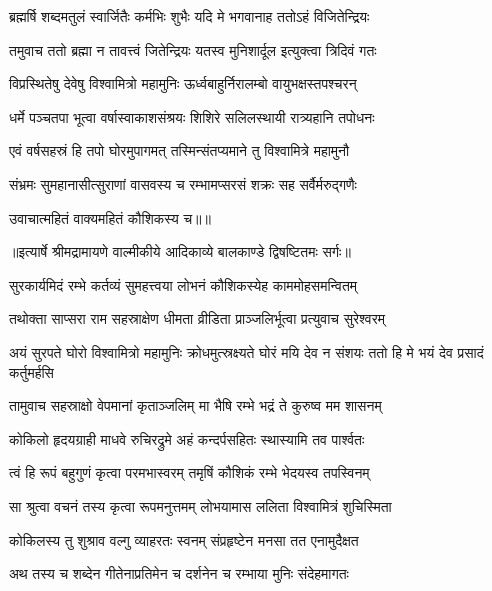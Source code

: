\twolineshloka
{ब्रह्मर्षि शब्दमतुलं स्वार्जितैः कर्मभिः शुभैः}
{यदि मे भगवानाह ततोऽहं विजितेन्द्रियः} %

\twolineshloka
{तमुवाच ततो ब्रह्मा न तावत्त्वं जितेन्द्रियः}
{यतस्व मुनिशार्दूल इत्युक्त्वा त्रिदिवं गतः} %

\twolineshloka
{विप्रस्थितेषु देवेषु विश्वामित्रो महामुनिः}
{ऊर्ध्वबाहुर्निरालम्बो वायुभक्षस्तपश्चरन्} %

\twolineshloka
{धर्मे पञ्चतपा भूत्वा वर्षास्वाकाशसंश्रयः}
{शिशिरे सलिलस्थायी रात्र्यहानि तपोधनः} %

\twolineshloka
{एवं वर्षसहस्रं हि तपो घोरमुपागमत्}
{तस्मिन्संतप्यमाने तु विश्वामित्रे महामुनौ} %

\twolineshloka
{संभ्रमः सुमहानासीत्सुराणां वासवस्य च}
{रम्भामप्सरसं शक्रः सह सर्वैर्मरुद्गणैः} %

{उवाचात्महितं वाक्यमहितं कौशिकस्य च॥॥} %

\addtocounter{shlokacount}{1}


{॥इत्यार्षे श्रीमद्रामायणे वाल्मीकीये आदिकाव्ये बालकाण्डे द्विषष्टितमः सर्गः॥}


\twolineshloka
{सुरकार्यमिदं रम्भे कर्तव्यं सुमहत्त्वया}
{लोभनं कौशिकस्येह काममोहसमन्वितम्} %

\twolineshloka
{तथोक्ता साप्सरा राम सहस्राक्षेण धीमता}
{व्रीडिता प्राञ्जलिर्भूत्वा प्रत्युवाच सुरेश्वरम्} %

\threelineshloka
{अयं सुरपते घोरो विश्वामित्रो महामुनिः}
{क्रोधमुत्स्रक्ष्यते घोरं मयि देव न संशयः}
{ततो हि मे भयं देव प्रसादं कर्तुमर्हसि} %

\twolineshloka
{तामुवाच सहस्राक्षो वेपमानां कृताञ्जलिम्}
{मा भैषि रम्भे भद्रं ते कुरुष्व मम शासनम्} %

\twolineshloka
{कोकिलो हृदयग्राही माधवे रुचिरद्रुमे}
{अहं कन्दर्पसहितः स्थास्यामि तव पार्श्वतः} %

\twolineshloka
{त्वं हि रूपं बहुगुणं कृत्वा परमभास्वरम्}
{तमृषिं कौशिकं रम्भे भेदयस्व तपस्विनम्} %

\twolineshloka
{सा श्रुत्वा वचनं तस्य कृत्वा रूपमनुत्तमम्}
{लोभयामास ललिता विश्वामित्रं शुचिस्मिता} %

\twolineshloka
{कोकिलस्य तु शुश्राव वल्गु व्याहरतः स्वनम्}
{संप्रहृष्टेन मनसा तत एनामुदैक्षत} %

\twolineshloka
{अथ तस्य च शब्देन गीतेनाप्रतिमेन च}
{दर्शनेन च रम्भाया मुनिः संदेहमागतः} %

